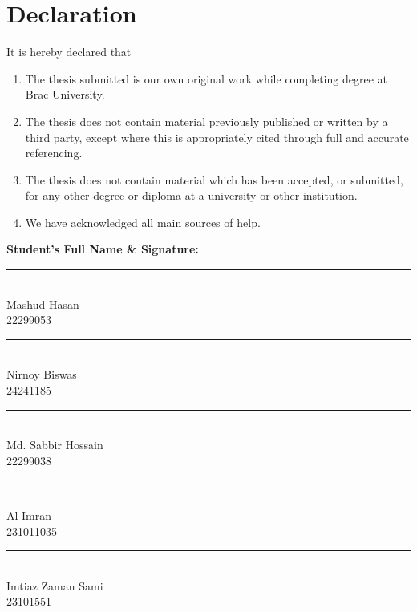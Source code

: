 \documentclass[12pt,a4paper]{report}
\begin{document}
\chapter*{Declaration}
It is hereby declared that
\begin{enumerate}
  \item The thesis submitted is our own original work while completing degree at Brac University.
  \item The thesis does not contain material previously published or written by a third party, except where this is appropriately cited through full and accurate referencing.
  \item The thesis does not contain material which has been accepted, or submitted, for any other degree or diploma at a university or other institution.
  \item We have acknowledged all main sources of help.
\end{enumerate}
\vspace{1em}\noindent\textbf{Student's Full Name \& Signature:}\par
\begin{minipage}[t]{0.45\textwidth}\centering\vspace{2.2em}\rule{0.8\textwidth}{0.4pt}\\ Mashud Hasan\\ 22299053\end{minipage}
\hfill
\begin{minipage}[t]{0.45\textwidth}\centering\vspace{2.2em}\rule{0.8\textwidth}{0.4pt}\\ Nirnoy Biswas\\ 24241185\end{minipage}
\hfill
\begin{minipage}[t]{0.45\textwidth}\centering\vspace{2.2em}\rule{0.8\textwidth}{0.4pt}\\ Md. Sabbir Hossain\\ 22299038\end{minipage}
\hfill
\begin{minipage}[t]{0.45\textwidth}\centering\vspace{2.2em}\rule{0.8\textwidth}{0.4pt}\\ Al Imran\\ 231011035\end{minipage}
\hfill
\begin{minipage}[t]{0.45\textwidth}\centering\vspace{2.2em}\rule{0.8\textwidth}{0.4pt}\\ Imtiaz Zaman Sami\\ 23101551\end{minipage}
\end{document}
